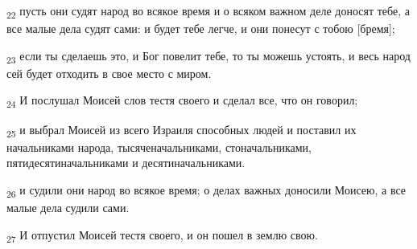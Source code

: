 \begin{tcolorbox}
\textsubscript{22} пусть они судят народ во всякое время и о всяком важном деле доносят тебе, а все малые дела судят сами: и будет тебе легче, и они понесут с тобою [бремя];
\end{tcolorbox}
\begin{tcolorbox}
\textsubscript{23} если ты сделаешь это, и Бог повелит тебе, то ты можешь устоять, и весь народ сей будет отходить в свое место с миром.
\end{tcolorbox}
\begin{tcolorbox}
\textsubscript{24} И послушал Моисей слов тестя своего и сделал все, что он говорил;
\end{tcolorbox}
\begin{tcolorbox}
\textsubscript{25} и выбрал Моисей из всего Израиля способных людей и поставил их начальниками народа, тысяченачальниками, стоначальниками, пятидесятиначальниками и десятиначальниками.
\end{tcolorbox}
\begin{tcolorbox}
\textsubscript{26} и судили они народ во всякое время; о делах важных доносили Моисею, а все малые дела судили сами.
\end{tcolorbox}
\begin{tcolorbox}
\textsubscript{27} И отпустил Моисей тестя своего, и он пошел в землю свою.
\end{tcolorbox}
